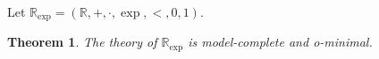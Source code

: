 \documentclass{amsart}
\newtheorem{theorem}{Theorem}[subsection]
\newtheorem{lemma}[theorem]{Lemma}
\newtheorem{corollary}[theorem]{Corollary}
\theoremstyle{definition}
\numberwithin{equation}{section}
\begin{document}
Let $\mathbb{R}_{\exp} = (\mathbb{R},+,\cdot,\exp,<,0,1)$.

\begin{theorem}
  The theory of $\mathbb{R}_{\exp}$ is model-complete and o-minimal.
\end{theorem}







\end{document}
